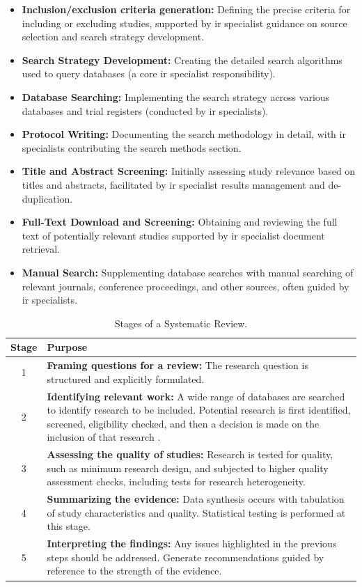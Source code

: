 \documentclass{article}
\begin{document}
\begin{itemize}
\item {\bf{Inclusion/exclusion criteria generation:}} Defining the precise criteria for including or excluding studies, supported by \gls*{ir} specialist guidance on source selection and search strategy development.
\item {\bf{Search Strategy Development:}} Creating the detailed search algorithms used to query databases (a core \gls*{ir} specialist responsibility).
\item {\bf{Database Searching:}} Implementing the search strategy across various databases and trial registers (conducted by \gls*{ir} specialists).
\item {\bf{Protocol Writing:}} Documenting the search methodology in detail, with \gls*{ir} specialists contributing the search methods section.
\item {\bf{Title and Abstract Screening:}} Initially assessing study relevance based on titles and abstracts, facilitated by \gls*{ir} specialist results management and de-duplication.
\item {\bf{Full-Text Download and Screening:}} Obtaining and reviewing the full text of potentially relevant studies supported by \gls*{ir} specialist document retrieval.
\item {\bf{Manual Search:}} Supplementing database searches with manual searching of relevant journals, conference proceedings, and other sources, often guided by \gls*{ir} specialists.
\end{itemize}



\begin{table}[t]
\centering
\small
\begin{tabular}{|c|p{}|}
\hline
\textbf{Stage} & \textbf{Purpose} \\
\hline
1 & \textbf{Framing questions for a review:} The research question is structured and explicitly formulated. \\\hline
2 & \textbf{Identifying relevant work:} A wide range of databases are searched to identify research to be included. Potential research is first identified, screened, eligibility checked, and then a decision is made on the inclusion of that research \cite{tawfik_step_2019}. \\\hline
3 & \textbf{Assessing the quality of studies:} Research is tested for quality, such as minimum research design, and subjected to higher quality assessment checks, including tests for research heterogeneity. \\\hline
4 & \textbf{Summarizing the evidence:} Data synthesis occurs with tabulation of study characteristics and quality. Statistical testing is performed at this stage. \\\hline
5 & \textbf{Interpreting the findings:} Any issues highlighted in the previous steps should be addressed. Generate recommendations guided by reference to the strength of the evidence. \\
\hline
\end{tabular}
\caption{Stages of a Systematic Review.}
\label{tab:stages_of_systematic review}
\end{table}
\end{document}
